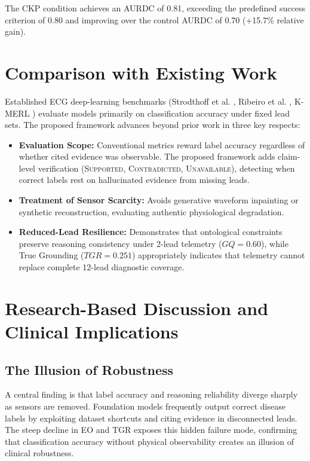 \documentclass{ssnreview}
\begin{document}
The CKP condition achieves an AURDC of 0.81, exceeding the predefined success criterion of 0.80
and improving over the control AURDC of 0.70 (+15.7\% relative gain).

\section{Comparison with Existing Work}

Established ECG deep-learning benchmarks (Strodthoff et al. \cite{strodthoff2021}, Ribeiro et
al. \cite{ribeiro2020}, K-MERL \cite{kmerl2025}) evaluate models primarily on classification
accuracy under fixed lead sets. The proposed framework advances beyond prior work in three key
respects:
\begin{itemize}
  \item \textbf{Evaluation Scope:} Conventional metrics reward label accuracy regardless of
  whether cited evidence was observable. The proposed framework adds claim-level verification
  (\textsc{Supported}, \textsc{Contradicted}, \textsc{Unavailable}), detecting when correct
  labels rest on hallucinated evidence from missing leads.
  \item \textbf{Treatment of Sensor Scarcity:} Avoids generative waveform inpainting or
  synthetic reconstruction, evaluating authentic physiological degradation.
  \item \textbf{Reduced-Lead Resilience:} Demonstrates that ontological constraints preserve
  reasoning consistency under 2-lead telemetry ($GQ = 0.60$), while True Grounding ($TGR = 0.251$)
  appropriately indicates that telemetry cannot replace complete 12-lead diagnostic coverage.
\end{itemize}

\section{Research-Based Discussion and Clinical Implications}

\subsection{The Illusion of Robustness}
A central finding is that label accuracy and reasoning reliability diverge sharply as sensors are
removed. Foundation models frequently output correct disease labels by exploiting dataset
shortcuts and citing evidence in disconnected leads. The steep decline in EO and TGR exposes
this hidden failure mode, confirming that classification accuracy without physical observability
creates an illusion of clinical robustness.
\end{document}
